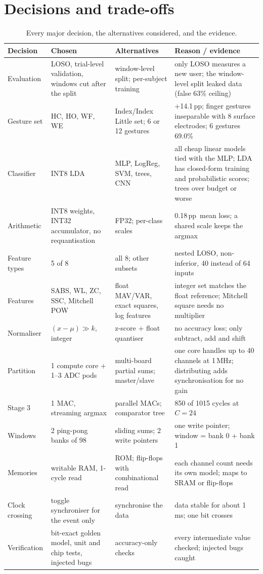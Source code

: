 \documentclass[11pt,a4paper]{article}
\newcommand{\pp}{\,pp}
\begin{document}
\section{Decisions and trade-offs}\label{sec:tradeoffs}
\begin{table}[htbp]\centering\small
\caption{Every major decision, the alternatives considered, and the evidence.}\label{tab:decisions}
\begin{tabular}{p{2.2cm}p{2.9cm}p{3.4cm}p{5.6cm}}\toprule
Decision & Chosen & Alternatives & Reason / evidence\\\midrule
Evaluation & LOSO, trial-level validation, windows cut after the split & window-level split; per-subject training & only LOSO measures a new user; the window-level split leaked data (false 63\% ceiling)\\
Gesture set & HC, HO, WF, WE & Index/Index Little set; 6 or 12 gestures & +14.1\pp; finger gestures inseparable with 8 surface electrodes; 6 gestures 69.0\%\\
Classifier & INT8 LDA & MLP, LogReg, SVM, trees, CNN & all cheap linear models tied with the MLP; LDA has closed-form training and probabilistic scores; trees over budget or worse\\
Arithmetic & INT8 weights, INT32 accumulator, no requantisation & FP32; per-class scales & 0.18\pp\ mean loss; a shared scale keeps the argmax\\
Feature types & 5 of 8 & all 8; other subsets & nested LOSO, non-inferior, 40 instead of 64 inputs\\
Features & SABS, WL, ZC, SSC, Mitchell POW & float MAV/VAR, exact squares, log features & integer set matches the float reference; Mitchell square needs no multiplier\\
Normaliser & $(x-\mu)\gg k$, integer & z-score + float quantiser & no accuracy loss; only subtract, add and shift\\
Partition & 1 compute core + 1--3 ADC pods & multi-board partial sums; master/slave & one core handles up to 40 channels at 1\,MHz; distributing adds synchronisation for no gain\\
Stage 3 & 1 MAC, streaming argmax & parallel MACs; comparator tree & 850 of 1015 cycles at $C=24$\\
Windows & 2 ping-pong banks of 98 & sliding sums; 2 write pointers & one write pointer; window = bank 0 + bank 1\\
Memories & writable RAM, 1-cycle read & ROM; flip-flops with combinational read & each channel count needs its own model; maps to SRAM or flip-flops\\
Clock crossing & toggle synchroniser for the event only & synchronise the data & data stable for about 1\,ms; one bit crosses\\
Verification & bit-exact golden model, unit and chip tests, injected bugs & accuracy-only checks & every intermediate value checked; injected bugs caught\\\bottomrule
\end{tabular}
\end{table}
\end{document}
